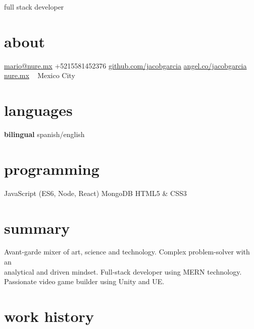 \documentclass[]{friggeri-cv}
\begin{document}
       {full stack developer}


\begin{aside}
  \section{about}
    \href{mailto:mario@nure.mx}{mario@nure.mx}
    +5215581452376
    \href{https://github.com/jacobgarcia}{github.com/jacobgarcia}
    \href{https://angel.co/jacobgarcia}{angel.co/jacobgarcia}
    \href{https://nure.mx}{nure.mx}
    ~
    Mexico City
  \section{languages}
    \textbf{bilingual}
    {spanish/english}
  \section{programming}
    {\color{red} JavaScript
    (ES6, Node, React)}
    MongoDB
    HTML5 \& CSS3
\end{aside}

\section{summary}

Avant-garde mixer of art, science and technology. Complex problem-solver with an \\
analytical and driven mindset. Full-stack developer using MERN technology. Passionate video game builder using Unity and UE.

\section{work history}
\end{document}
